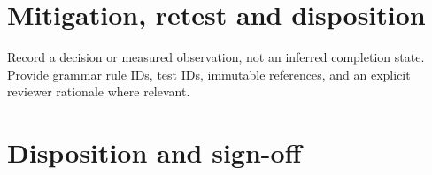 \documentclass[11pt,letterpaper]{article}
\begin{document}
\section{Mitigation, retest and disposition}
Record a decision or measured observation, not an inferred completion state. Provide grammar rule IDs, test IDs, immutable references, and an explicit reviewer rationale where relevant.
\section{Disposition and sign-off}
\end{document}
